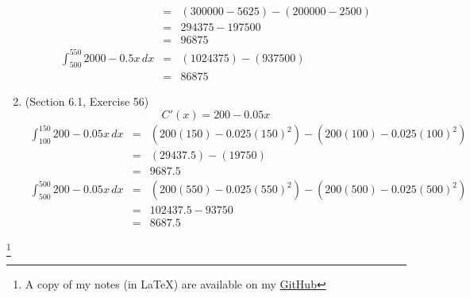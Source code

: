 \documentclass{article}
\newcommand\blfootnote[1]{
    \begingroup
    \renewcommand\thefootnote{}\footnote{#1}
    \addtocounter{footnote}{-1}
    \endgroup
}
\begin{document}
\begin{enumerate}
\begin{eqnarray}
                                              &=& \left(300000 - 5625\right) - \left(200000 - 2500\right) \\
                                              &=& 294375 - 197500 \\
                                              &=& 96875 \\
            \int_{500}^{550}{2000 - 0.5x\,dx} &=& \left(1024375\right) - \left(937500\right) \\
                                              &=& 86875
        \end{eqnarray}
    \item (Section 6.1, Exercise 56)
        $$C'(x) = 200 - 0.05x$$
        \begin{eqnarray}
            \int_{100}^{150}{200 - 0.05x\,dx} &=& \left(200(150) - 0.025(150)^2\right) - \left(200(100) - 0.025(100)^2\right) \\
                                              &=& \left(29437.5\right) - \left(19750\right) \\
                                              &=& 9687.5 \\
            \int_{500}^{500}{200 - 0.05x\,dx} &=& \left(200(550) - 0.025(550)^2\right) - \left(200(500) - 0.025(500)^2\right) \\
                                              &=& 102437.5 - 93750 \\
                                              &=& 8687.5
        \end{eqnarray}
\end{enumerate}

\blfootnote{A copy of my notes (in \LaTeX) are available on my \href{https://github.com/onlinechronically/MATH-211}{GitHub}}
\end{document}
